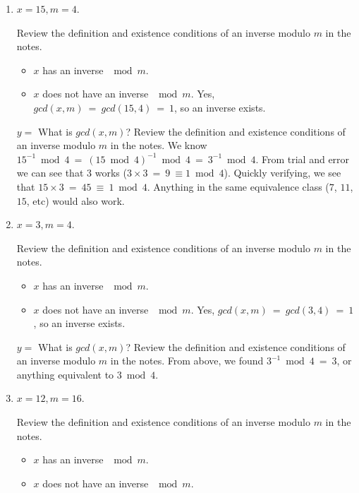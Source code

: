 \documentclass[11pt, preview]{standalone} %
\begin{document}
\begin{enumerate}
\begin{enumerate}
\begin{Freeform}{2}
\end{Freeform}
\item $x = 15, m = 4$.
\begin{Choices} 
Review the definition and existence conditions of an inverse modulo $m$ in the notes.
\begin{itemize}
\TrueChoice\item $x$ has an inverse $\mod m$.
\FalseChoice\item $x$ does not have an inverse $\mod m$.
\Solution Yes, $gcd(x, m)\ =\ gcd(15, 4)\ =\ 1$, so an inverse exists.
\end{itemize}
\end{Choices}
\begin{Freeform}{3}
$y =$ 
\Hint What is $gcd(x,m)$? Review the definition and existence conditions of an inverse modulo $m$ in the notes.
\Solution We know $15^{-1} \bmod 4\ =\ (15 \bmod 4)^{-1} \bmod 4\ =\ 3^{-1} \bmod 4$. From trial and error we can see that $3$ works ($3 \times 3\ =\ 9\ \equiv 1 \bmod 4$). Quickly verifying, we see that $15 \times 3\ =\ 45\ \equiv\ 1 \bmod 4$. Anything in the same equivalence class ($7$, $11$, $15$, etc) would also work.
\end{Freeform}
\item $x = 3, m = 4$.
\begin{Choices} 
Review the definition and existence conditions of an inverse modulo $m$ in the notes.
\begin{itemize}
\TrueChoice\item $x$ has an inverse $\mod m$.
\FalseChoice\item $x$ does not have an inverse $\mod m$.
\Solution Yes, $gcd(x, m)\ =\ gcd(3, 4)\ =\ 1$, so an inverse exists.
\end{itemize}
\end{Choices}
\begin{Freeform}{3}
$y =$ 
\Hint What is $gcd(x,m)$? Review the definition and existence conditions of an inverse modulo $m$ in the notes.
\Solution From above, we found $3^{-1} \bmod 4\ =\ 3$, or anything equivalent to $3 \bmod 4$.
\end{Freeform}
\item $x = 12, m = 16$.
\begin{Choices} 
Review the definition and existence conditions of an inverse modulo $m$ in the notes.
\begin{itemize}
\FalseChoice\item $x$ has an inverse $\mod m$.
\TrueChoice\item $x$ does not have an inverse $\mod m$.

\end{itemize}
\end{Choices}
\end{enumerate}
\end{enumerate}
\end{document}
